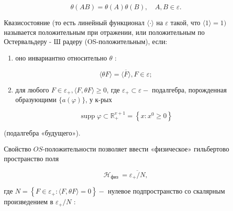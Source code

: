 \documentclass[10pt]{article}
\begin{document}
\[

\theta(A B)=\theta(A) \theta(B), \quad A, B \in \varepsilon .

\]



Квазисостояние (то есть линейный функционал $\langle\cdot\rangle$ на $\varepsilon$ такой, что $\langle 1\rangle=1)$ называется положительным при отражении, или положительным по Остервальдеру - Ш радеру (OS-положительным), если:



\begin{enumerate}

  \item оно инвариантно относительно $\theta$ :

\end{enumerate}



\[

\langle\theta F\rangle=\overline{\langle F\rangle}, F \in \varepsilon ;

\]



\begin{enumerate}

  \setcounter{enumi}{1}

  \item для любого $F \in \varepsilon_{+},\langle F, \theta F\rangle \geqslant 0$, где $\varepsilon_{+} \subset \varepsilon-$ подалгебра, порожденная образующими $\{a(\varphi)\}$, у к-рых

\end{enumerate}



\[

\operatorname{supp} \varphi \subset \mathbb{R}_{+}^{v+1}=\left\{x: x^{0} \geqslant 0\right\}

\]



(подалгебра «будущего»).



Свойство $O S$-положительности позволяет ввести «физическое» гильбертово пространство поля



\[

\mathscr{H}_{\text {физ }}=\overline{\varepsilon_{+} / N},

\]



где $N=\left\{F \in \varepsilon_{+}:\langle F, \theta F\rangle=0\right\}-$ нулевое подпространство со скалярным произведением в $\varepsilon_{+} / N$ :
\end{document}
